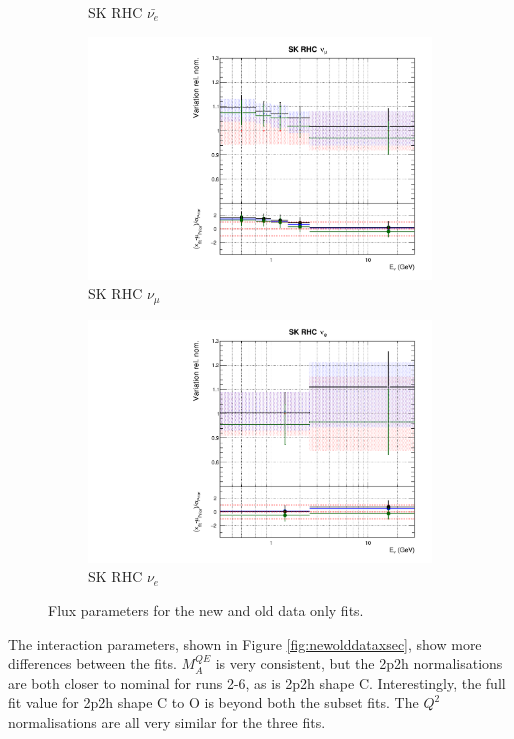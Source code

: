 \begin{figure}
\begin{subfigure}{0.24\textwidth}
  \caption{SK RHC $\bar{\nu_e}$}
\end{subfigure}
\begin{subfigure}{0.24\textwidth}
  \centering
  \includegraphics[width=0.95\linewidth]{figs/newolddatafitsflux_14}
  \caption{SK RHC $\nu_{\mu}$}
\end{subfigure}
\begin{subfigure}{0.24\textwidth}
  \centering
  \includegraphics[width=0.95\linewidth]{figs/newolddatafitsflux_15}
  \caption{SK RHC $\nu_e$}
\end{subfigure}
\caption{Flux parameters for the new and old data only fits.}
\label{fig:newolddataflux}
\end{figure}

The interaction parameters, shown in Figure \ref{fig:newolddataxsec}, show more differences between the fits. $M_{A}^{QE}$ is very consistent, but the 2p2h normalisations are both closer to nominal for runs 2-6, as is 2p2h shape C. Interestingly, the full fit value for 2p2h shape C to O is beyond both the subset fits. The $Q^2$ normalisations are all very similar for the three fits.

